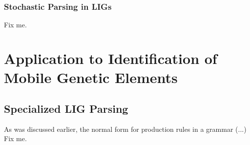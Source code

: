 \documentclass[11pt]{article}
\begin{document}
\subsubsection {Stochastic Parsing in LIGs}
Fix me.
\section {Application to Identification of Mobile Genetic Elements}
\subsection {Specialized LIG Parsing}
As was discussed earlier, the normal form for production rules in a grammar (...) Fix me.


\end{document}
